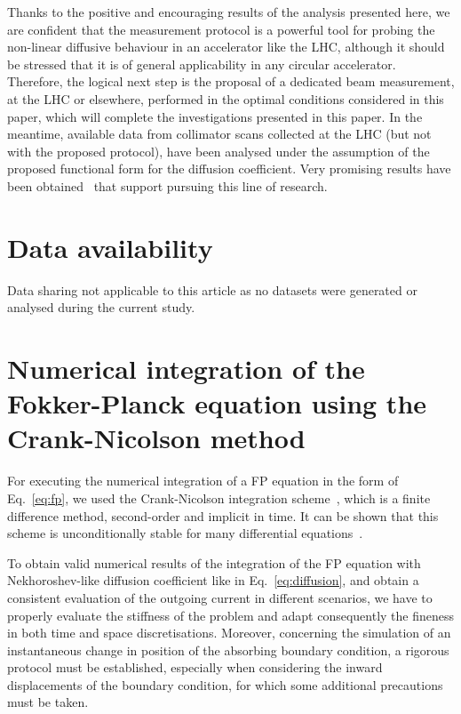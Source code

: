 Thanks to the positive and encouraging results of the analysis presented here, we are confident that the measurement protocol is a powerful tool for probing the non-linear diffusive behaviour in an accelerator like the LHC, {although it should be stressed that it is of general applicability in any circular accelerator. Therefore, the logical next step is the proposal of a dedicated beam measurement, at the LHC or elsewhere, performed in the optimal conditions considered in this paper, which will complete the investigations presented in this paper. In the meantime, available data from collimator scans collected at the LHC (but not with the proposed protocol), have been analysed under the assumption of the proposed functional form for the diffusion coefficient. Very promising results have been obtained~\cite{montanari:ipac22-mopost043} that support pursuing this line of research.}

\section*{Data availability}
%
Data sharing not applicable to this article as no datasets were generated or analysed during the current study.
%



 
\section{Numerical integration of the Fokker-Planck equation using the Crank-Nicolson method} \label{app_sec:numerical_integration_with_crank_nicolson}


For executing the numerical integration of a FP equation in the form of Eq.~\eqref{eq:fp}, we used the Crank-Nicolson integration scheme~\cite{crank1947practical}, which is a finite difference method, second-order and implicit in time. It can be shown that this scheme is unconditionally stable for many differential equations~\cite{thomas2013numerical}.

To obtain valid numerical results of the integration of the FP equation with Nekhoroshev-like diffusion coefficient like in Eq.~\eqref{eq:diffusion}, and obtain a consistent evaluation of the outgoing current in different scenarios, we have to properly evaluate the stiffness of the problem and adapt consequently the fineness in both time and space discretisations. Moreover, concerning the simulation of an instantaneous change in position of the absorbing boundary condition, a rigorous protocol must be established, especially when considering the inward displacements of the boundary condition, for which some additional precautions must be taken.

